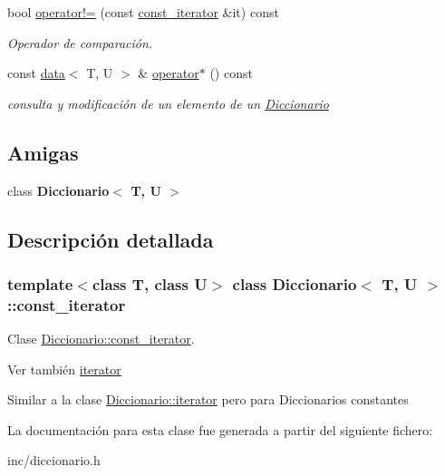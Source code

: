 \begin{DoxyCompactItemize}
bool \hyperlink{classDiccionario_1_1const__iterator_a777889fc946c8ed7143a3f019c6e3b71}{operator!=} (const \hyperlink{classDiccionario_1_1const__iterator}{const\+\_\+iterator} \&it) const
\begin{DoxyCompactList}\small\item\em Operador de comparación. \end{DoxyCompactList}\item 
\mbox{\label{classDiccionario_1_1const__iterator_afe6e0383add54be2b97696692d62caeb}} 
const \hyperlink{structdata}{data}$<$ T, U $>$ \& \hyperlink{classDiccionario_1_1const__iterator_afe6e0383add54be2b97696692d62caeb}{operator$\ast$} () const
\begin{DoxyCompactList}\small\item\em consulta y modificación de un elemento de un \hyperlink{classDiccionario}{Diccionario} \end{DoxyCompactList}\end{DoxyCompactItemize}
\subsection*{Amigas}
\begin{DoxyCompactItemize}
\item 
\mbox{\label{classDiccionario_1_1const__iterator_ae50c4dcf749ac5c49596da52815dfa85}} 
class {\bfseries Diccionario$<$ T, U $>$}
\end{DoxyCompactItemize}


\subsection{Descripción detallada}
\subsubsection*{template$<$class T, class U$>$\newline
class Diccionario$<$ T, U $>$\+::const\+\_\+iterator}

Clase \hyperlink{classDiccionario_1_1const__iterator}{Diccionario\+::const\+\_\+iterator}. 

\begin{DoxySeeAlso}{Ver también}
\hyperlink{classDiccionario_1_1iterator}{iterator}
\end{DoxySeeAlso}
Similar a la clase \hyperlink{classDiccionario_1_1iterator}{Diccionario\+::iterator} pero para Diccionarios constantes 

La documentación para esta clase fue generada a partir del siguiente fichero\+:\begin{DoxyCompactItemize}
\item 
inc/diccionario.\+h\end{DoxyCompactItemize}

